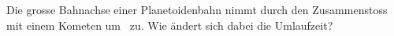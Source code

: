 Die grosse Bahnachse einer Planetoidenbahn nimmt durch den Zusammenstoss mit einem Kometen um \pgaO\ zu. Wie ändert sich dabei die Umlaufzeit?

